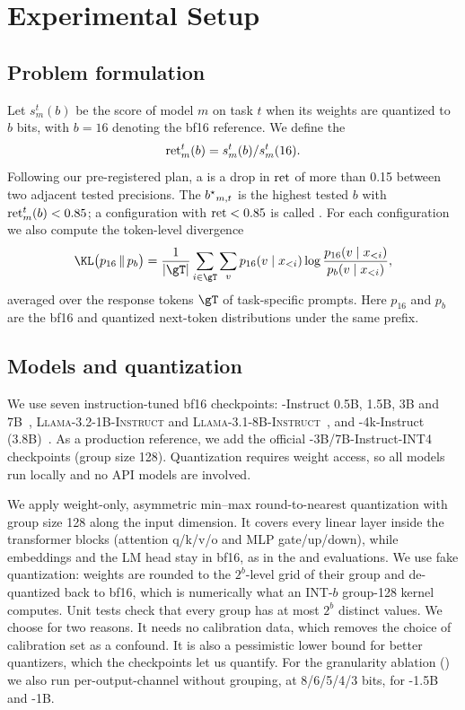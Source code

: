 \section{Experimental Setup}
\label{sec:method}

\subsection{Problem formulation}
Let $s_m^t(b)$ be the score of model $m$ on task $t$ when its weights are quantized to $b$ bits, with $b=16$ denoting the bf16 reference. We define the 
\begin{equation}
\mathrm{ret}_m^t(b) = s_m^t(b) / s_m^t(16).
\end{equation}
Following our pre-registered plan, a  is a drop in $\mathrm{ret}$ of more than 0.15 between two adjacent tested precisions. The  ${b^{\star}}_{m,t}$ is the highest tested $b$ with $\mathrm{ret}_m^t(b)<0.85$; a configuration with $\mathrm{ret}<0.85$ is called . For each configuration we also compute the token-level divergence
\begin{equation}
\KL\big(p_{16}\,\|\,p_b\big) = \frac{1}{|\gT|}\sum_{i\in\gT}\sum_{v} p_{16}(v\mid x_{<i}) \log\frac{p_{16}(v\mid x_{<i})}{p_b(v\mid x_{<i})},
\end{equation}
averaged over the response tokens $\gT$ of task-specific prompts. Here $p_{16}$ and $p_b$ are the bf16 and quantized next-token distributions under the same prefix.

\subsection{Models and quantization}
 We use seven instruction-tuned bf16 checkpoints: \qwen-Instruct 0.5B, 1.5B, 3B and 7B~\cite{qwen2025qwen25}, \textsc{Llama-3.2-1B-Instruct} and \textsc{Llama-3.1-8B-Instruct}~\cite{grattafiori2024llama3}, and \phithree-4k-Instruct (3.8B)~\cite{abdin2024phi3}. As a production reference, we add the official \qwen-3B/7B-Instruct-\awq INT4 checkpoints (group size 128). Quantization requires weight access, so all models run locally and no API models are involved.

 We apply weight-only, asymmetric min--max round-to-nearest quantization with group size 128 along the input dimension. It covers every linear layer inside the transformer blocks (attention q/k/v/o and MLP gate/up/down), while embeddings and the LM head stay in bf16, as in the \gptq and \awq evaluations. We use fake quantization: weights are rounded to the $2^b$-level grid of their group and de-quantized back to bf16, which is numerically what an INT-$b$ group-128 kernel computes. Unit tests check that every group has at most $2^b$ distinct values. We choose \rtn for two reasons. It needs no calibration data, which removes the choice of calibration set as a confound. It is also a pessimistic lower bound for better quantizers, which the \awq checkpoints let us quantify. For the granularity ablation () we also run per-output-channel \rtn without grouping, at 8/6/5/4/3 bits, for \qwen-1.5B and \llama-1B.

